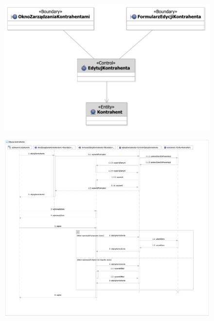 \begin{figure}[H]
  \centering
  \includegraphics[angle=\ecbangle, scale=\ecbscale]{../img/usecase/pu10ecb.pdf}
  \caption{}
\end{figure}
\begin{figure}[H]
  \centering
  \includegraphics[angle=\seqangle, scale=0.43]{../img/usecase/pu10seq.pdf}
  \caption{}
\end{figure}
\newpage

